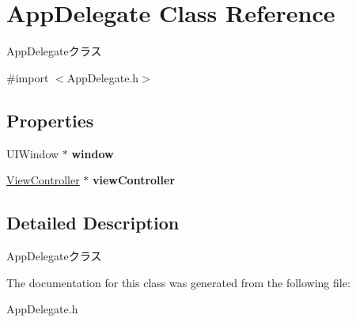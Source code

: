 \hypertarget{interface_app_delegate}{\section{App\-Delegate Class Reference}
\label{interface_app_delegate}
}


App\-Delegateクラス  




{\ttfamily \#import $<$App\-Delegate.\-h$>$}

\subsection*{Properties}
\begin{DoxyCompactItemize}
\item 
\hypertarget{interface_app_delegate_acf48ac24125e688cac1a85445cd7fac2}{U\-I\-Window $\ast$ {\bfseries window}}\label{interface_app_delegate_acf48ac24125e688cac1a85445cd7fac2}

\item 
\hypertarget{interface_app_delegate_afdae0acffddf96a8e7930b1151734078}{\hyperlink{interface_view_controller}{View\-Controller} $\ast$ {\bfseries view\-Controller}}\label{interface_app_delegate_afdae0acffddf96a8e7930b1151734078}

\end{DoxyCompactItemize}


\subsection{Detailed Description}
App\-Delegateクラス 

The documentation for this class was generated from the following file\-:\begin{DoxyCompactItemize}
\item 
App\-Delegate.\-h\end{DoxyCompactItemize}
